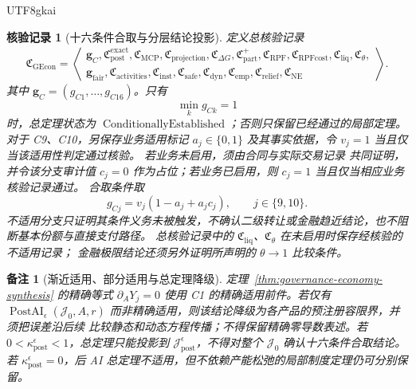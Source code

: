 \documentclass[12pt,a4paper,openany]{report}
\newtheorem{remark}{备注}[chapter]
\newtheorem{Certificate}{核验记录}[chapter]
\newcommand{\Goods}{\mathcal J}
\DeclareMathOperator{\PostAI}{PostAI}
\begin{document}
\begin{CJK*}{UTF8}{gkai}
\begin{Certificate}[十六条件合取与分层结论投影]
定义总核验记录
\[
  \mathfrak C_{\mathrm{GEcon}}
  =
  \left\langle
  \begin{gathered}
  \mathbf g_C,
  \mathfrak C_{\mathrm{post}}^{\mathrm{exact}},
  \mathfrak C_{\mathrm{MCP}},
  \mathfrak C_{\mathrm{projection}},
  \mathfrak C_{\Delta G},
  \mathfrak C_{\mathrm{part}}^+,
  \mathfrak C_{\mathrm{RPF}},
  \mathfrak C_{\mathrm{RPFcost}},
  \mathfrak C_{\mathrm{liq}},
  \mathfrak C_{\theta},\\
  \mathbf g_{\mathrm{fair}},
  \mathfrak C_{\mathrm{activities}},
  \mathfrak C_{\mathrm{inst}},
  \mathfrak C_{\mathrm{safe}},
  \mathfrak C_{\mathrm{dyn}},
  \mathfrak C_{\mathrm{emp}},
  \mathfrak C_{\mathrm{relief}},
  \mathfrak C_{\mathrm{NE}}
  \end{gathered}
  \right\rangle.
\]
其中 \(\mathbf g_C=(g_{C1},\ldots,g_{C16})\)。只有
\[
  \min_k g_{Ck}=1
\]
时，总定理状态为 \(\operatorname{ConditionallyEstablished}\)；否则只保留已经通过的局部定理。
对于 C9、C10，另保存业务适用标记 \(a_j\in\{0,1\}\) 及其事实依据，令 \(v_j=1\) 当且仅当该适用性判定通过核验。
若业务未启用，须由合同与实际交易记录
共同证明，并令该分支审计值 \(c_j=0\) 作为占位；若业务已启用，则 \(c_j=1\) 当且仅当相应业务核验记录通过。
合取条件取
\[
  g_{Cj}=v_j(1-a_j+a_jc_j),\qquad j\in\{9,10\}.
\]
不适用分支只证明其条件义务未被触发，不确认二级转让或金融趋近结论，也不阻断基本份额与直接支付路径。
总核验记录中的 \(\mathfrak C_{\mathrm{liq}}\)、\(\mathfrak C_{\theta}\) 在未启用时保存经核验的不适用记录；
金融极限结论还须另外证明所声明的 \(\theta\to1\) 比较条件。
\end{Certificate}

\begin{remark}[渐近适用、部分适用与总定理降级]
定理~\ref{thm:governance-economy-synthesis} 的精确等式
\(\partial_A Y_j=0\) 使用 C1 的精确适用前件。若仅有
\(\PostAI_\epsilon(\Goods_0,A,r)\) 而非精确适用，则该结论降级为各产品的预注册容限界，并须把误差沿后续
比较静态和动态方程传播；不得保留精确零导数表述。若
\(0<\kappa_{\mathrm{post}}^\epsilon<1\)，总定理只能投影到
\(\Goods_{\mathrm{post}}^\epsilon\)，不得对整个 \(\Goods_0\) 确认十六条件合取结论。若
\(\kappa_{\mathrm{post}}^\epsilon=0\)，后 AI 总定理不适用，但不依赖产能松弛的局部制度定理仍可分别保留。
\end{remark}


\end{CJK*}
\end{document}
